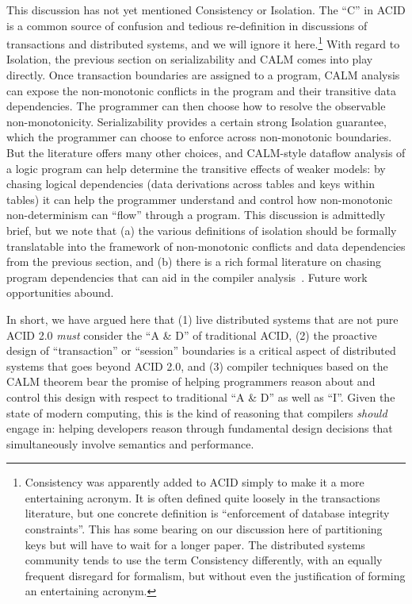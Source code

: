 \documentclass{sig-alternate}
\begin{document}
This discussion has not yet mentioned Consistency or Isolation.  The ``C'' in ACID is a common source of confusion and tedious re-definition in discussions of transactions and distributed systems, and we will ignore it here.\footnote{Consistency was apparently added to ACID simply to make it a more entertaining acronym.  It is often defined quite loosely in the transactions literature, but one concrete definition is ``enforcement of database integrity constraints''.  This has some bearing on our discussion here of partitioning keys but will have to wait for a longer paper.  The distributed systems community tends to use the term Consistency differently, with an equally frequent disregard for formalism, but without even the justification of forming an entertaining acronym.}  With regard to Isolation, the previous section on serializability and CALM comes into play directly.  Once transaction boundaries are assigned to a program, CALM analysis can expose the non-monotonic conflicts in the program and their transitive data dependencies.  The programmer can then choose how to resolve the observable non-monotonicity.  Serializability provides a certain strong Isolation guarantee, which the programmer can choose to enforce across non-monotonic boundaries.  But the literature offers many other choices, and CALM-style dataflow analysis of a logic program can help determine the transitive effects of weaker models: by chasing logical dependencies (data derivations across tables and keys within tables) it can help the programmer understand and control how non-monotonic non-determinism can ``flow'' through a program.  This discussion is admittedly brief, but we note that (a) the various definitions of isolation should be formally translatable into the framework of non-monotonic conflicts and data dependencies from the previous section, and (b) there is a rich formal literature on chasing program dependencies that can aid in the compiler analysis~\cite{alicebook}.  Future work opportunities abound.

In short, we have argued here that (1) live distributed systems that are not pure ACID 2.0 \emph{must} consider the ``A \& D'' of traditional ACID, (2) the proactive design of ``transaction'' or ``session'' boundaries is a critical aspect of distributed systems that goes beyond ACID 2.0, and (3) compiler techniques based on the CALM theorem bear the promise of helping programmers reason about and control this design with respect to traditional ``A \& D'' as well as ``I''.  Given the state of modern computing, this is the kind of reasoning that compilers \emph{should} engage in: helping developers reason through fundamental design decisions that simultaneously involve semantics and performance.  
\end{document}

